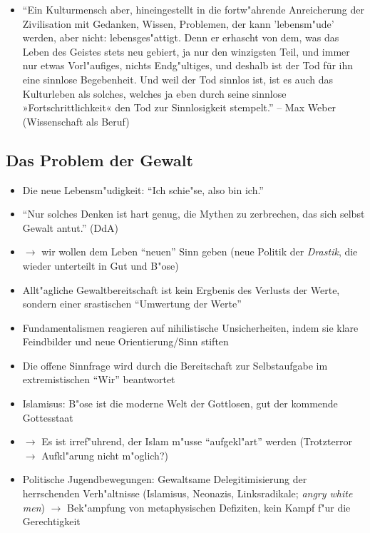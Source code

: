 \documentclass[emulatestandardclasses]{scrartcl}
\begin{document}
\begin{itemize}
  \item "`Ein Kulturmensch aber, hineingestellt in die fortw"ahrende Anreicherung der Zivilisation mit Gedanken, Wissen, Problemen, der kann 'lebensm"ude' werden, aber nicht: lebensges"attigt. Denn er erhascht von dem, was das Leben des Geistes stets neu gebiert, ja nur den winzigsten Teil, und immer nur etwas Vorl"aufiges, nichts Endg"ultiges, und deshalb ist der Tod für ihn eine sinnlose Begebenheit. Und weil der Tod sinnlos ist, ist es auch das Kulturleben als solches, welches ja eben durch seine sinnlose »Fortschrittlichkeit« den Tod zur Sinnlosigkeit stempelt."'  -- Max Weber (Wissenschaft als Beruf)
\end{itemize}

\subsection{Das Problem der Gewalt}

\begin{itemize}
  \item Die neue Lebensm"udigkeit: "`Ich schie"se, also bin ich."'
  \item "`Nur solches Denken ist hart genug, die Mythen zu zerbrechen, das sich selbst Gewalt antut."' (DdA)
  \item $\rightarrow$ wir wollen dem Leben "`neuen"' Sinn geben (neue Politik der \emph{Drastik}, die wieder unterteilt in Gut und B"ose)
  \item Allt"agliche Gewaltbereitschaft ist kein Ergbenis des Verlusts der Werte, sondern einer srastischen "`Umwertung der Werte"'
  \item Fundamentalismen reagieren auf nihilistische Unsicherheiten, indem sie klare Feindbilder und neue Orientierung/Sinn stiften
  \item Die offene Sinnfrage wird durch die Bereitschaft zur Selbstaufgabe im extremistischen "`Wir"' beantwortet
  \item Islamisus: B"ose ist die moderne Welt der Gottlosen, gut der kommende Gottesstaat
  \item $\rightarrow$ Es ist irref"uhrend, der Islam m"usse "`aufgekl"art"' werden (Trotzterror $\rightarrow$  Aufkl"arung nicht m"oglich?)
  \item Politische Jugendbewegungen: Gewaltsame Delegitimisierung der herrschenden Verh"altnisse (Islamisus, Neonazis, Linksradikale; \emph{angry white men}) $\rightarrow$  Bek"ampfung von metaphysischen Defiziten, kein Kampf f"ur die Gerechtigkeit
\end{itemize}
\end{document}
